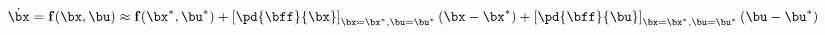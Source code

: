 \documentclass[preview]{standalone}
\begin{document}
\begin{align*}
\begin{equation}\dot\bx = {\bf f}(\bx,\bu) \approx {\bf f}(\bx^*,\bu^*) + \left[ \pd{\bff}{\bx}\right]_{\bx=\bx^*,\bu=\bu^*} (\bx - \bx^*) + \left[ \pd{\bff}{\bu}\right]_{\bx=\bx^*,\bu=\bu^*} (\bu - \bu^*)\end{equation}
\end{align*}
\end{document}
